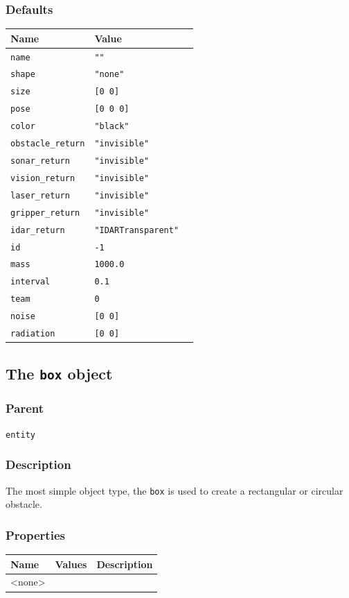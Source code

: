 \documentclass[11pt,twoside]{report}
\begin{document}
\subsubsection*{Defaults}
\begin{tabularx}{\columnwidth}{llX}
\hline
Name & Value\\
\hline
\verb'name' & \verb'""'\\
\verb'shape' & \verb'"none"'\\
\verb'size' & \verb'[0 0]'\\
\verb'pose' & \verb'[0 0 0]'\\
\verb'color' & \verb'"black"'\\
\verb'obstacle_return' & \verb'"invisible"'\\
\verb'sonar_return' & \verb'"invisible"'\\
\verb'vision_return' & \verb'"invisible"'\\
\verb'laser_return' & \verb'"invisible"'\\
\verb'gripper_return' & \verb'"invisible"'\\
\verb'idar_return' & \verb'"IDARTransparent"'\\
\verb'id' & \verb'-1'\\
\verb'mass' & \verb'1000.0'\\
\verb'interval' & \verb'0.1'\\
\verb'team' & \verb'0'\\
\verb'noise' & \verb'[0 0]'\\
\verb'radiation' & \verb'[0 0]'\\
\hline
\end{tabularx}



\newpage
\subsection{The {\tt box} object}

\subsubsection*{Parent}
{\tt entity}

\subsubsection*{Description}
The most simple object type, the \verb'box' is used to create a
rectangular or circular obstacle.

\subsubsection*{Properties}
\begin{tabularx}{\columnwidth}{llX}
\hline
Name & Values & Description \\
\hline
<none>\\
\hline
\end{tabularx}
\end{document}
